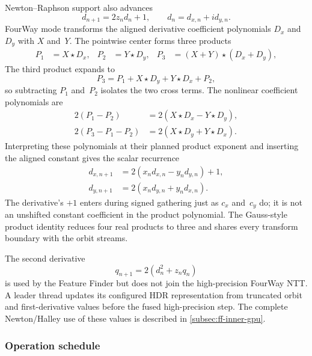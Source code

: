 Newton--Raphson support also advances
\begin{equation}
  d_{n+1}=2z_nd_n+1,
  \qquad d_n=d_{x,n}+i d_{y,n}.
  \label{eq:fused-dzdc-complex}
\end{equation}
FourWay mode transforms the aligned derivative coefficient polynomials $D_x$
and $D_y$ with $X$ and~$Y$.  The pointwise center forms three products
\begin{align}
  P_1 &= X\star D_x, &
  P_2 &= Y\star D_y, &
  P_3 &= (X+Y)\star(D_x+D_y),
  \label{eq:fused-derivative-products}
\end{align}
The third product expands to
\begin{equation}
  P_3=P_1+X\star D_y+Y\star D_x+P_2,
\end{equation}
so subtracting $P_1$ and~$P_2$ isolates the two cross terms.  The nonlinear
coefficient polynomials are
\begin{align}
  2(P_1-P_2) &= 2(X\star D_x-Y\star D_y), \\
  2(P_3-P_1-P_2) &= 2(X\star D_y+Y\star D_x).
\end{align}
Interpreting these polynomials at their planned product exponent and inserting
the aligned constant gives the scalar recurrence
\begin{align}
  d_{x,n+1} &= 2(x_n d_{x,n}-y_n d_{y,n})+1, \\
  d_{y,n+1} &= 2(x_n d_{y,n}+y_n d_{x,n}).
  \label{eq:fused-derivative-reconstruction}
\end{align}
The derivative's $+1$ enters during signed gathering just as $c_x$ and~$c_y$
do; it is not an unshifted constant coefficient in the product polynomial.
The Gauss-style product identity reduces four real products to three and
shares every transform boundary with the orbit streams.

The second derivative
\begin{equation}
  q_{n+1}=2(d_n^2+z_nq_n)
\end{equation}
is used by the Feature Finder but does not join the high-precision FourWay NTT.
A leader thread updates its configured HDR representation from truncated orbit
and first-derivative values before the fused high-precision step.  The complete
Newton/Halley use of these values is described in
\cref{subsec:ff-inner-gpu}.

\subsubsection{Operation schedule}
\label{subsec:fused-ntt-operation-schedule}

